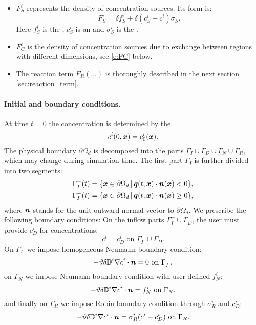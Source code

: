 \begin{itemize}
\item $F_S^i$  represents the density of concentration sources.
Its form is:
\begin{equation}
 F_S^i = \delta f^i_S + \delta(c_S^i-c^i)\sigma_S. \label{eqn:transport_sources}
\end{equation}
Here $f_S^i$  is the , $c_S^i$  is an  and $\sigma_S^i$  is the .

\item $F^c_C$  is the density of concentration sources due to exchange between regions with different dimensions, see \eqref{e:FC} below.

\item The reaction term $F_R(\dots)$  is thoroughly described in the next section \ref{sec:reaction_term}.
\end{itemize}



\paragraph{Initial and boundary conditions.}
At time $t=0$ the concentration is determined by the 
$$ c^i(0,\mathbf{\boldsymbol{x}}) = c^i_0(\mathbf{\boldsymbol{x}}). $$
The physical boundary $\partial\Omega_d$ is decomposed into the parts $\Gamma_I\cup\Gamma_D\cup\Gamma_N\cup\Gamma_R$, which may change during simulation time.
The first part $\Gamma_I$ is further divided into two segments:
\begin{align*}
\Gamma_I^+(t) &= \{\mathbf{\boldsymbol{x}}\in \partial\Omega_d\,|\, \mathbf{\boldsymbol{q}}(t,\mathbf{\boldsymbol{x}})\cdot\mathbf{\boldsymbol{n}}(\mathbf{\boldsymbol{x}})<0\},\\
\Gamma_I^-(t) &= \{\mathbf{\boldsymbol{x}}\in \partial\Omega_d\,|\, \mathbf{\boldsymbol{q}}(t,\mathbf{\boldsymbol{x}})\cdot\mathbf{\boldsymbol{n}}(\mathbf{\boldsymbol{x}})\ge 0\},
\end{align*}
where $\mathbf{\boldsymbol{n}}$ stands for the unit outward normal vector to $\partial\Omega_d$.
We prescribe the following boundary conditions:
On the inflow parts $\Gamma_I^+\cup\Gamma_D$, the user must provide  $c_D^i$ for concentrations:
$$ c^i = c^i_D \mbox{ on }\Gamma_I^+\cup\Gamma_D. $$
On $\Gamma_I^-$ we impose homogeneous Neumann boundary condition:
$$ -\vartheta\delta{{\mathbb{D}}}^i\nabla c^i\cdot\mathbf{\boldsymbol{n}} = 0 \mbox{ on }\Gamma_I^-, $$
on $\Gamma_N$ we impose Neumann boundary condition with user-defined  $f^i_N$:
$$ -\vartheta\delta{{\mathbb{D}}}^i\nabla c^i\cdot\mathbf{\boldsymbol{n}} = f^i_N \mbox{ on }\Gamma_N, $$
and finally on $\Gamma_R$ we impose Robin boundary condition through  $\sigma^i_R$ and  $c^i_D$:
$$ -\vartheta\delta{{\mathbb{D}}}^i\nabla c^i\cdot\mathbf{\boldsymbol{n}} = \sigma^i_R(c^i-c^i_D) \mbox{ on }\Gamma_R. $$






